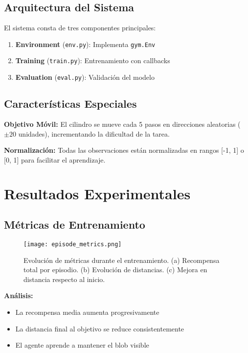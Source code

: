 \documentclass[12pt,a4paper]{article}
\begin{document}
\subsection{Arquitectura del Sistema}

El sistema consta de tres componentes principales:

\begin{enumerate}
    \item \textbf{Environment} (\texttt{env.py}): Implementa \texttt{gym.Env}
    \item \textbf{Training} (\texttt{train.py}): Entrenamiento con callbacks
    \item \textbf{Evaluation} (\texttt{eval.py}): Validación del modelo
\end{enumerate}

\subsection{Características Especiales}

\textbf{Objetivo Móvil:} El cilindro se mueve cada 5 pasos en direcciones aleatorias ($\pm 20$ unidades), incrementando la dificultad de la tarea.

\textbf{Normalización:} Todas las observaciones están normalizadas en rangos [-1, 1] o [0, 1] para facilitar el aprendizaje.

\section{Resultados Experimentales}

\subsection{Métricas de Entrenamiento}

\begin{figure}[H]
    \centering
    \texttt{[image: episode\_metrics.png]}
    \caption{Evolución de métricas durante el entrenamiento. (a) Recompensa total por episodio. (b) Evolución de distancias. (c) Mejora en distancia respecto al inicio.}
    \label{fig:training_metrics}
\end{figure}

\textbf{Análisis:}
\begin{itemize}
    \item La recompensa media aumenta progresivamente
    \item La distancia final al objetivo se reduce consistentemente
    \item El agente aprende a mantener el blob visible
\end{itemize}
\end{document}
